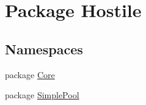 \hypertarget{namespace_hostile}{\section{Package Hostile}
\label{namespace_hostile}
}
\subsection*{Namespaces}
\begin{DoxyCompactItemize}
\item 
package \hyperlink{namespace_hostile_1_1_core}{Core}
\item 
package \hyperlink{namespace_hostile_1_1_simple_pool}{Simple\-Pool}
\end{DoxyCompactItemize}
